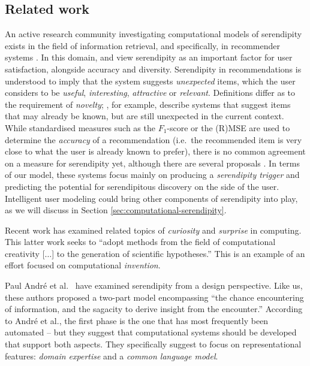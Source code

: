 \subsection{Related work} \label{sec:related}

An active research community investigating computational models of serendipity exists in the field of information retrieval, and specifically, in recommender systems \cite{Toms2000}. In this domain,  and  view serendipity as an important factor for user satisfaction, alongside accuracy and diversity.  Serendipity in recommendations is
understood to imply that the system suggests \emph{unexpected} items, which the user considers to be \emph{useful}, \emph{interesting}, \emph{attractive} or \emph{relevant}. 
Definitions differ as to the requirement of \emph{novelty}; , for example, describe systems that suggest items that may already be known, but are still unexpected in the current context.  While standardised measures such as the $F_1$-score or the (R)MSE are used to determine the \emph{accuracy} of a recommendation (i.e.~the recommended item is very close to what the user is already known to prefer), there is no common agreement on a measure for serendipity yet, although there are several proposals \cite{Murakami2008, Adamopoulos2011, McCay-Peet2011,iaquinta2010can}.
In terms of our model, these systems focus mainly on producing a \emph{serendipity trigger} and predicting the potential for serendipitous discovery on the side of the user.  Intelligent user modeling could bring other components of serendipity into play, as we will discuss in Section \ref{sec:computational-serendipity}.

Recent work has examined related topics of \emph{curiosity}
\cite{wu2013curiosity} and \emph{surprise} \cite{grace2014using} in
computing.  This latter work seeks to ``adopt methods from the field
of computational creativity [$\ldots$] to the generation of scientific
hypotheses.''  This is an example of an effort focused on
computational \emph{invention}.

Paul Andr{\'e} et al.~\citeyear{andre2009discovery} have examined
serendipity from a design perspective.  Like us, these authors
proposed a two-part model encompassing ``the chance encountering of
information, and the sagacity to derive insight from the encounter.''
According to Andr\'e et al., the first phase is the one that has most
frequently been automated -- but they suggest that computational
systems should be developed that support both aspects.  They
specifically suggest to focus on representational features:
\emph{domain expertise} and a \emph{common language model}.

